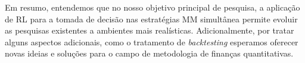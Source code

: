 Em resumo, entendemos que no nosso objetivo principal de pesquisa, a aplicação de RL para a tomada de decisão nas estratégias MM simultânea permite evoluir as pesquisas existentes a ambientes mais realísticas. 
Adicionalmente, por tratar alguns aspectos adicionais, como o tratamento de \textit{backtesting} esperamos oferecer novas ideias e soluções para o campo de metodologia de finanças quantitativas.

